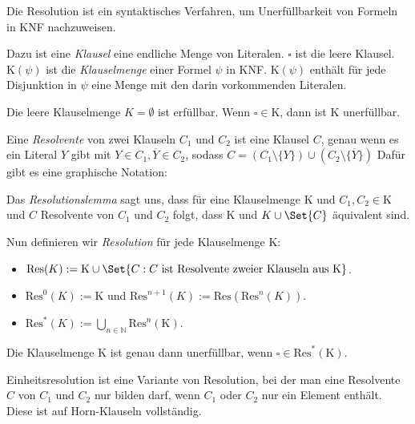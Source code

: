 \documentclass{panikzettel}
\newcommand{\Kl}{\mathrm{K}}
\newcommand{\Res}{\mathrm{Res}}
\begin{document}
Die Resolution ist ein syntaktisches Verfahren, um Unerfüllbarkeit von Formeln in KNF nachzuweisen.

Dazu ist eine \emph{Klausel} eine endliche Menge von Literalen. $\square$ ist die leere Klausel. $\Kl(\psi)$ ist die \emph{Klauselmenge} einer Formel $\psi$ in KNF. $\Kl(\psi)$ enthält für jede Disjunktion in $\psi$ eine Menge mit den darin vorkommenden Literalen.

Die leere Klauselmenge $K = \emptyset$ ist erfüllbar. Wenn $\square \in \Kl$, dann ist $\Kl$ unerfüllbar.

\begin{minipage}[t]{0.6\textwidth}
Eine \emph{Resolvente} von zwei Klauseln $C_1$ und $C_2$ ist eine Klausel $C$, genau wenn es ein Literal $Y$ gibt mit $Y \in C_1, \overline{Y} \in C_2$, sodass $C = (C_1 \setminus \{Y\}) \cup (C_2 \setminus \{\overline{Y}\})$ Dafür gibt es eine graphische Notation:
\end{minipage}\hfill%
\begin{minipage}[t]{0.35\textwidth}
\vspace{0\baselineskip}
\begin{tightcenter}
\end{tightcenter}
\end{minipage}

Das \emph{Resolutionslemma} sagt uns, dass für eine Klauselmenge $\Kl$ und $C_1, C_2 \in \Kl$ und $C$ Resolvente von $C_1$ und $C_2$ folgt, dass $\Kl$ und $K \cup \Set{C}$ äquivalent sind.

Nun definieren wir \emph{Resolution} für jede Klauselmenge $\Kl$:
\begin{itemize}
\item $\Res(K) := \Kl \cup \Set{C : C \textrm{ ist Resolvente zweier Klauseln aus } \Kl}$.
\item $\Res^0(K) := \Kl$ und $\Res^{n+1}(K) := \Res(\Res^n(K))$.
\item $\Res^\ast(K) := \bigcup_{n \in \mathbb{N}} \Res^n(\Kl)$.
\end{itemize}

Die Klauselmenge $\Kl$ ist genau dann unerfüllbar, wenn $\square \in \Res^\ast(\Kl)$.

Einheitsresolution ist eine Variante von Resolution, bei der man eine Resolvente $C$ von $C_1$ und $C_2$ nur bilden darf, wenn $C_1$ oder $C_2$ nur ein Element enthält. Diese ist auf Horn-Klauseln vollständig.
\end{document}
